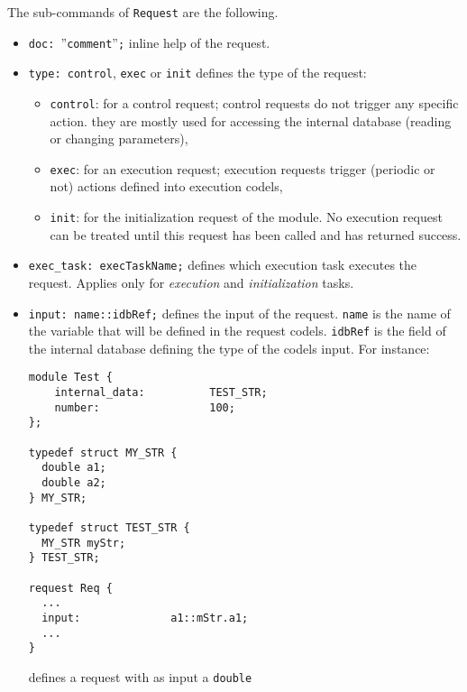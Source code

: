 \noindent
The sub-commands of \texttt{Request} are the following.\\

\begin{itemize}
\item[]\texttt{doc: }''\texttt{comment}''{\tt;} inline help of the request.
\item[]\texttt{type:  control}, \texttt{exec} or \texttt{init} defines the type of the request:
  \begin{itemize}
  \item \texttt{control}: for a control request; control requests do not
    trigger any specific action. they are mostly used for accessing the
    internal database (reading or changing parameters),
  \item \texttt{exec}: for an execution request; execution requests trigger
    (periodic or not) actions defined into execution codels,
  \item \texttt{init}: for the initialization request of the module. No
    execution request can be treated until this request has been
    called and has returned success.
  \end{itemize}

\item[]\texttt{exec\_task:  execTaskName;} defines which execution task
executes the request. Applies only for \emph{execution} and
\emph{initialization} tasks.

\item[]\texttt{input: name::idbRef;} defines the input of the
  request. \texttt{name} is the name of the variable that will be
  defined in the request codels. \texttt{idbRef} is the field of the
  internal database defining the type of the codels input. For instance:\\
\begin{verbatim}
module Test {
    internal_data:          TEST_STR;
    number:                 100;
};

typedef struct MY_STR {
  double a1;
  double a2;
} MY_STR;

typedef struct TEST_STR {
  MY_STR myStr;
} TEST_STR;

request Req {
  ...
  input:              a1::mStr.a1;
  ...
}
\end{verbatim}
defines a request with as input a \texttt{double}\\


\end{itemize}
